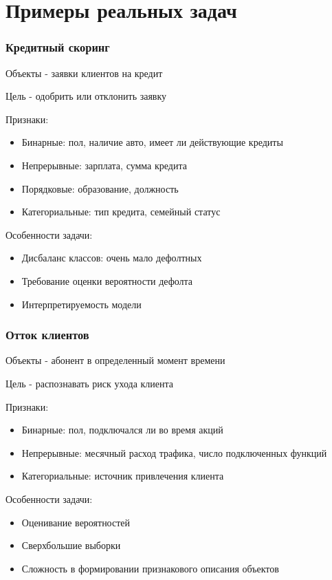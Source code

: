\documentclass{beamer}
\begin{document}
	\section{Примеры реальных задач}
	
	
	\begin{frame}
		\frametitle{Кредитный скоринг}
		Объекты - заявки клиентов на кредит
		
		Цель - одобрить или отклонить заявку
		
		\vspace{5pt}
		
		Признаки:
		\begin{itemize}
			\item Бинарные: пол, наличие авто, имеет ли действующие кредиты
			\item Непрерывные: зарплата, сумма кредита
			\item Порядковые: образование, должность
			\item Категориальные: тип кредита, семейный статус
		\end{itemize}
	
		Особенности задачи:
		\begin{itemize}
			\item Дисбаланс классов: очень мало дефолтных
			\item Требование оценки вероятности дефолта
			\item Интерпретируемость модели
		\end{itemize}
	\end{frame}
	
	
	\begin{frame}
		\frametitle{Отток клиентов}
		Объекты - абонент в определенный момент времени
		
		Цель - распознавать риск ухода клиента
		
		\vspace{5pt}
		
		Признаки:
		\begin{itemize}
			\item Бинарные: пол, подключался ли во время акций
			\item Непрерывные: месячный расход трафика, число подключенных функций
			\item Категориальные: источник привлечения клиента
		\end{itemize}
		
		Особенности задачи:
		\begin{itemize}
			\item Оценивание вероятностей
			\item Сверхбольшие выборки
			\item Сложность в формировании признакового описания объектов
		\end{itemize}
	\end{frame}
	
\end{document}
